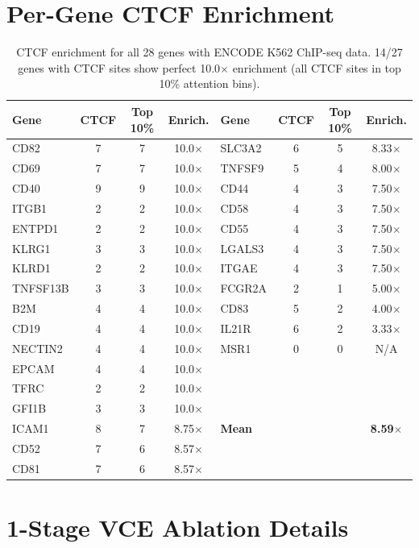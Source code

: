 \documentclass{article}
\begin{document}
\section{Per-Gene CTCF Enrichment}
\label{app:ctcf}

\begin{table}[H]
\centering
\small
\caption{CTCF enrichment for all 28 genes with ENCODE K562 ChIP-seq data. 14/27 genes with CTCF sites show perfect 10.0$\times$ enrichment (all CTCF sites in top 10\% attention bins).}
\begin{tabular}{lccclccc}
\toprule
Gene & CTCF & Top 10\% & Enrich. & Gene & CTCF & Top 10\% & Enrich. \\
\midrule
CD82 & 7 & 7 & 10.0$\times$ & SLC3A2 & 6 & 5 & 8.33$\times$ \\
CD69 & 7 & 7 & 10.0$\times$ & TNFSF9 & 5 & 4 & 8.00$\times$ \\
CD40 & 9 & 9 & 10.0$\times$ & CD44 & 4 & 3 & 7.50$\times$ \\
ITGB1 & 2 & 2 & 10.0$\times$ & CD58 & 4 & 3 & 7.50$\times$ \\
ENTPD1 & 2 & 2 & 10.0$\times$ & CD55 & 4 & 3 & 7.50$\times$ \\
KLRG1 & 3 & 3 & 10.0$\times$ & LGALS3 & 4 & 3 & 7.50$\times$ \\
KLRD1 & 2 & 2 & 10.0$\times$ & ITGAE & 4 & 3 & 7.50$\times$ \\
TNFSF13B & 3 & 3 & 10.0$\times$ & FCGR2A & 2 & 1 & 5.00$\times$ \\
B2M & 4 & 4 & 10.0$\times$ & CD83 & 5 & 2 & 4.00$\times$ \\
CD19 & 4 & 4 & 10.0$\times$ & IL21R & 6 & 2 & 3.33$\times$ \\
NECTIN2 & 4 & 4 & 10.0$\times$ & MSR1 & 0 & 0 & N/A \\
EPCAM & 4 & 4 & 10.0$\times$ & & & & \\
TFRC & 2 & 2 & 10.0$\times$ & & & & \\
GFI1B & 3 & 3 & 10.0$\times$ & & & & \\
\midrule
ICAM1 & 8 & 7 & 8.75$\times$ & \textbf{Mean} & & & \textbf{8.59$\times$} \\
CD52 & 7 & 6 & 8.57$\times$ & & & & \\
CD81 & 7 & 6 & 8.57$\times$ & & & & \\
\bottomrule
\end{tabular}
\label{tab:ctcf_full}
\end{table}

\section{1-Stage VCE Ablation Details}
\label{app:ablation_full}
\end{document}
